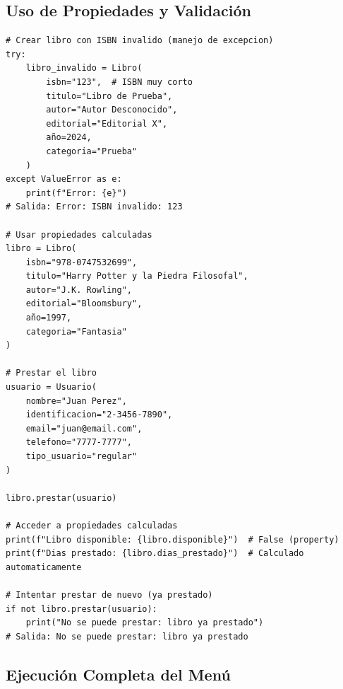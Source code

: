 \documentclass[11pt,letterpaper]{article}
\begin{document}
\subsection{Uso de Propiedades y Validación}

\begin{lstlisting}[caption={Ejemplo de propiedades y validación}]
# Crear libro con ISBN invalido (manejo de excepcion)
try:
    libro_invalido = Libro(
        isbn="123",  # ISBN muy corto
        titulo="Libro de Prueba",
        autor="Autor Desconocido",
        editorial="Editorial X",
        año=2024,
        categoria="Prueba"
    )
except ValueError as e:
    print(f"Error: {e}")
# Salida: Error: ISBN invalido: 123

# Usar propiedades calculadas
libro = Libro(
    isbn="978-0747532699",
    titulo="Harry Potter y la Piedra Filosofal",
    autor="J.K. Rowling",
    editorial="Bloomsbury",
    año=1997,
    categoria="Fantasia"
)

# Prestar el libro
usuario = Usuario(
    nombre="Juan Perez",
    identificacion="2-3456-7890",
    email="juan@email.com",
    telefono="7777-7777",
    tipo_usuario="regular"
)

libro.prestar(usuario)

# Acceder a propiedades calculadas
print(f"Libro disponible: {libro.disponible}")  # False (property)
print(f"Dias prestado: {libro.dias_prestado}")  # Calculado automaticamente

# Intentar prestar de nuevo (ya prestado)
if not libro.prestar(usuario):
    print("No se puede prestar: libro ya prestado")
# Salida: No se puede prestar: libro ya prestado
\end{lstlisting}

\subsection{Ejecución Completa del Menú}
\end{document}
